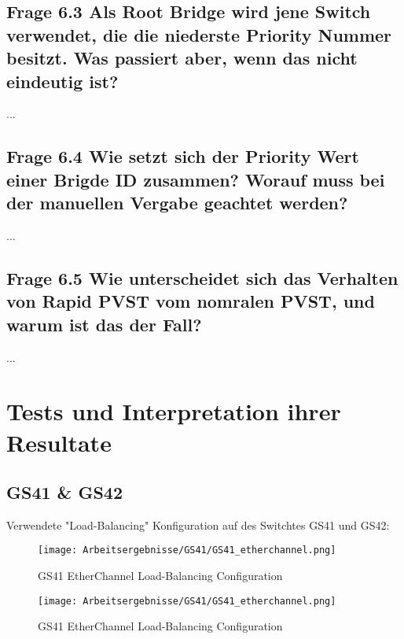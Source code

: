 \documentclass{article}
\begin{document}
\subsection*{Frage 6.3 \normalfont Als Root Bridge wird jene Switch verwendet, die die niederste Priority Nummer besitzt. Was passiert aber, wenn das nicht eindeutig ist?}
...\\

\subsection*{Frage 6.4 \normalfont Wie setzt sich der Priority Wert einer Brigde ID zusammen? Worauf muss bei der manuellen Vergabe geachtet werden?} 
...\\

\subsection*{Frage 6.5 \normalfont Wie unterscheidet sich das Verhalten von Rapid PVST vom nomralen PVST, und warum ist das der Fall?}
...\\

\pagebreak
\section{Tests und Interpretation ihrer Resultate}

\subsection{GS41 \& GS42}
Verwendete "Load-Balancing" Konfiguration auf des Switchtes GS41 und GS42:\\
\begin{figure}[!htp]
  \centering
  \begin{minipage}[b]{0.45\textwidth}
    \texttt{[image: Arbeitsergebnisse/GS41/GS41\_etherchannel.png]}
    \caption{GS41 EtherChannel Load-Balancing Configuration}
  \end{minipage}
  \hspace{0.8cm}
  \begin{minipage}[b]{0.45\textwidth}
    \texttt{[image: Arbeitsergebnisse/GS41/GS41\_etherchannel.png]}
    \caption{GS41 EtherChannel Load-Balancing Configuration}
  \end{minipage}
\end{figure}

\pagebreak
\end{document}
